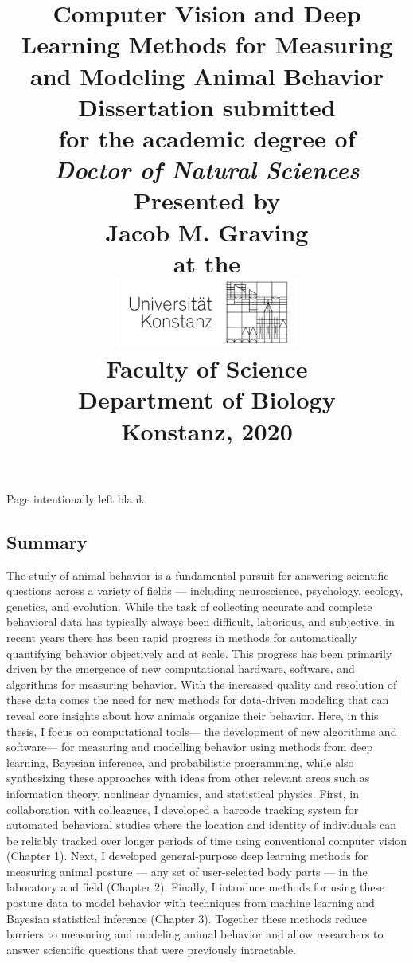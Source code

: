 \documentclass[11pt,a4paper,twoside]{book}
\title{
	\HUGE \textbf{Computer Vision and Deep Learning Methods for Measuring and Modeling Animal Behavior} \\
	\vspace{4cm}
	\Large Dissertation submitted \\
	\Large for the academic degree of \\
	\vspace{0.5cm}
	\Large \textit{Doctor of Natural Sciences} \\

	\vspace{2cm}
    \Large Presented by \\
    \vspace{0.5cm}
    \LARGE Jacob M. Graving \\
    \vspace{0.5cm}
    \Large at the \\
    \vspace{0.1cm}
	\includegraphics[width=6cm]{Graving_IMPRS_Thesis/graphics/uni_logo.png}\\
	\vspace{2cm}
	\Large Faculty of Science \\
	\Large Department of Biology \\
	\vspace{2cm}
	\Large Konstanz, 2020
	\date{}
}
\begin{document}
	\maketitle
    \newpage
    Page intentionally left blank
    \newpage
	\tableofcontents
	\setcounter{page}{1}
\begin{doublespace}
	\chapter*{Summary}
  The study of animal behavior is a fundamental pursuit for answering scientific questions across a variety of fields --- including neuroscience, psychology, ecology, genetics, and evolution. While the task of collecting accurate and complete behavioral data has typically always been difficult, laborious, and subjective, in recent years there has been rapid progress in methods for automatically quantifying behavior objectively and at scale. This progress has been primarily driven by the emergence of new computational hardware, software, and algorithms for measuring behavior. With the increased quality and resolution of these data comes the need for new methods for data-driven modeling that can reveal core insights about how animals organize their behavior. Here, in this thesis, I focus on computational tools— the development of new algorithms and software— for measuring and modelling behavior using methods from deep learning, Bayesian inference, and probabilistic programming, while also synthesizing these approaches with ideas from other relevant areas such as information theory, nonlinear dynamics, and statistical physics. First, in collaboration with colleagues, I developed a barcode tracking system for automated behavioral studies where the location and identity of individuals can be reliably tracked over longer periods of time using conventional computer vision (Chapter 1). Next, I developed general-purpose deep learning methods for measuring animal posture --- any set of user-selected body parts --- in the laboratory and field (Chapter 2). Finally, I introduce methods for using these posture data to model behavior with techniques from machine learning and Bayesian statistical inference (Chapter 3). Together these methods reduce barriers to measuring and modeling animal behavior and allow researchers to answer scientific questions that were previously intractable.


\end{doublespace}
\end{document}
